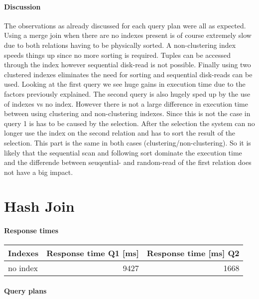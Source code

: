 \documentclass[11pt]{scrartcl}
\begin{document}
\paragraph{Discussion}
The observations as already discussed for each query plan were all as expected. Using a merge join when there are no indexes present is of course extremely slow due to both relations having to be physically sorted.
A non-clustering index speeds things up since no more sorting is required. Tuples can be accessed through the index however sequential disk-read is not possible.
Finally using two clustered indexes eliminates the need for sorting and sequential disk-reads can be used. Looking at the first query we see huge gains in execution time due to the factors previously explained.
The second query is also hugely sped up by the use of indexes vs no index. However there is not a large difference in execution time between using clustering and non-clustering indexes. Since this is not the case
in query 1 is has to be caused by the selection. After the selection the system can no longer use the index on the second relation and has to sort the result of the selection.
This part is the same in both cases (clustering/non-clustering). So it is likely that the sequential scan and following sort dominate the execution time and the differende between seuqential- and random-read of the first
relation does not have a big impact.

\section{Hash Join}

\paragraph{Response times}

\begin{flushleft}
\begin{tabular}{l|r|r}
  Indexes & Response time Q1 [ms] & Response time [ms] Q2 \\
  \hline
  no index & 9427 & 1668 \\
\end{tabular}
\end{flushleft}

\paragraph{Query plans}\mbox{}\\ 
\end{document}
